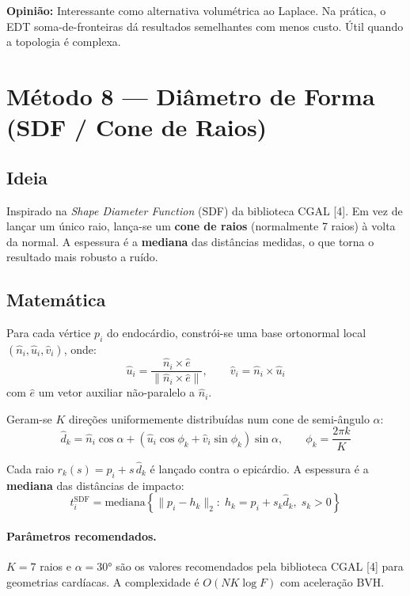 \documentclass[a4paper,12pt]{article}
\begin{document}
\noindent\textbf{Opinião:} Interessante como alternativa volumétrica ao
Laplace. Na prática, o EDT soma-de-fronteiras dá resultados semelhantes
com menos custo. Útil quando a topologia é complexa.

\section{Método 8 --- Diâmetro de Forma (SDF / Cone de Raios)}
\label{sec:sdf}

\subsection{Ideia}
Inspirado na \emph{Shape Diameter Function} (SDF) da biblioteca CGAL [4].
Em vez de lançar um único raio, lança-se um \textbf{cone de raios}
(normalmente 7 raios) à volta da normal. A espessura é a \textbf{mediana}
das distâncias medidas, o que torna o resultado mais robusto a ruído.

\subsection{Matemática}
Para cada vértice $p_i$ do endocárdio, constrói-se uma base ortonormal
local $(\hat{n}_i, \hat{u}_i, \hat{v}_i)$, onde:
\begin{equation}
  \hat{u}_i = \frac{\hat{n}_i \times \hat{e}}{\|\hat{n}_i \times \hat{e}\|},
  \qquad
  \hat{v}_i = \hat{n}_i \times \hat{u}_i
\end{equation}
com $\hat{e}$ um vetor auxiliar não-paralelo a $\hat{n}_i$.

Geram-se $K$ direções uniformemente distribuídas num cone de
semi-ângulo $\alpha$:
\begin{equation}
  \hat{d}_k = \hat{n}_i \cos\alpha
    + (\hat{u}_i\cos\phi_k + \hat{v}_i\sin\phi_k)\sin\alpha,
  \qquad \phi_k = \frac{2\pi k}{K}
\end{equation}

Cada raio $r_k(s) = p_i + s\,\hat{d}_k$ é lançado contra o epicárdio.
A espessura é a \textbf{mediana} das distâncias de impacto:
\begin{equation}
  t_i^{\text{SDF}} = \text{mediana}\left\{\|p_i - h_k\|_2 :\;
    h_k = p_i + s_k\hat{d}_k,\; s_k > 0\right\}
\end{equation}

\paragraph{Parâmetros recomendados.}
$K = 7$ raios e $\alpha = 30°$ são os valores recomendados pela
biblioteca CGAL [4] para geometrias cardíacas. A complexidade é
$O(NK \log F)$ com aceleração BVH.
\end{document}
